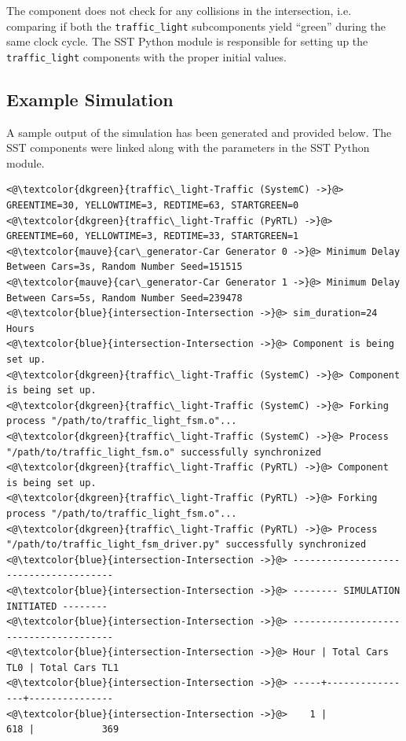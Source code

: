 \documentclass{article}
\begin{document}
      The component does not check for any collisions in the intersection, i.e. comparing if both
      the \lstinline{traffic_light} subcomponents yield ``green'' during the same clock cycle. The
      SST Python module is responsible for setting up the \lstinline{traffic_light} components with
      the proper initial values.

    \subsection{Example Simulation}
    A sample output of the simulation has been generated and provided below. The SST components were
    linked along with the parameters in the SST Python module.

\begin{lstlisting}[caption={Sample Simulation Output}, captionpos=b]
<@\textcolor{dkgreen}{traffic\_light-Traffic (SystemC) ->}@> GREENTIME=30, YELLOWTIME=3, REDTIME=63, STARTGREEN=0
<@\textcolor{dkgreen}{traffic\_light-Traffic (PyRTL) ->}@> GREENTIME=60, YELLOWTIME=3, REDTIME=33, STARTGREEN=1
<@\textcolor{mauve}{car\_generator-Car Generator 0 ->}@> Minimum Delay Between Cars=3s, Random Number Seed=151515
<@\textcolor{mauve}{car\_generator-Car Generator 1 ->}@> Minimum Delay Between Cars=5s, Random Number Seed=239478
<@\textcolor{blue}{intersection-Intersection ->}@> sim_duration=24 Hours
<@\textcolor{blue}{intersection-Intersection ->}@> Component is being set up.
<@\textcolor{dkgreen}{traffic\_light-Traffic (SystemC) ->}@> Component is being set up.
<@\textcolor{dkgreen}{traffic\_light-Traffic (SystemC) ->}@> Forking process "/path/to/traffic_light_fsm.o"...
<@\textcolor{dkgreen}{traffic\_light-Traffic (SystemC) ->}@> Process "/path/to/traffic_light_fsm.o" successfully synchronized
<@\textcolor{dkgreen}{traffic\_light-Traffic (PyRTL) ->}@> Component is being set up.
<@\textcolor{dkgreen}{traffic\_light-Traffic (PyRTL) ->}@> Forking process "/path/to/traffic_light_fsm.o"...
<@\textcolor{dkgreen}{traffic\_light-Traffic (PyRTL) ->}@> Process "/path/to/traffic_light_fsm_driver.py" successfully synchronized
<@\textcolor{blue}{intersection-Intersection ->}@> --------------------------------------
<@\textcolor{blue}{intersection-Intersection ->}@> -------- SIMULATION INITIATED --------
<@\textcolor{blue}{intersection-Intersection ->}@> --------------------------------------
<@\textcolor{blue}{intersection-Intersection ->}@> Hour | Total Cars TL0 | Total Cars TL1
<@\textcolor{blue}{intersection-Intersection ->}@> -----+----------------+---------------
<@\textcolor{blue}{intersection-Intersection ->}@>    1 |              618 |            369

\end{lstlisting}
\end{document}
